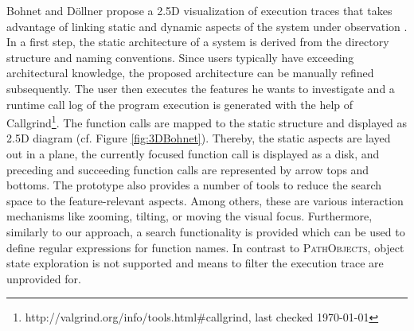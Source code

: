 Bohnet and Döllner propose a 2.5D visualization of execution traces that takes advantage of linking static and dynamic aspects of the system under observation \cite{bohnet_visual_2006}.
In a first step, the static architecture of a system is derived from the directory structure and naming conventions.
Since users typically have exceeding architectural knowledge, the proposed architecture can be manually refined subsequently.
The user then executes the features he wants to investigate and a runtime call log of the program execution is generated with the help of Callgrind\footnote{http://valgrind.org/info/tools.html\#callgrind, last checked \today}.
The function calls are mapped to the static structure and displayed as 2.5D diagram (cf. Figure \ref{fig:3DBohnet}).
Thereby, the static aspects are layed out in a plane, the currently focused function call is displayed as a disk, and preceding and succeeding function calls are represented by arrow tops and bottoms.
The prototype also provides a number of tools to reduce the search space to the feature-relevant aspects.
Among others, these are various interaction mechanisms like zooming, tilting, or moving the visual focus.
Furthermore, similarly to our approach, a search functionality is provided which can be used to define regular expressions for function names.
In contrast to \textsc{PathObjects}, object state exploration is not supported and means to filter the execution trace are unprovided for.

